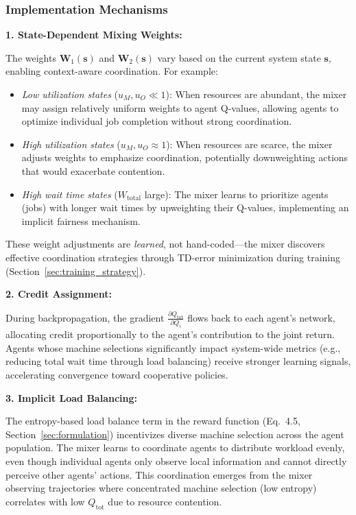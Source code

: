 \subsubsection{Implementation Mechanisms}

\textbf{1. State-Dependent Mixing Weights:}

The weights \(\mathbf{W}_1(\mathbf{s})\) and \(\mathbf{W}_2(\mathbf{s})\) vary based on the current system state \(\mathbf{s}\), enabling context-aware coordination. For example:
\begin{itemize}
    \item \textit{Low utilization states} (\(u_M, u_O \ll 1\)): When resources are abundant, the mixer may assign relatively uniform weights to agent Q-values, allowing agents to optimize individual job completion without strong coordination.
    \item \textit{High utilization states} (\(u_M, u_O \approx 1\)): When resources are scarce, the mixer adjusts weights to emphasize coordination, potentially downweighting actions that would exacerbate contention.
    \item \textit{High wait time states} (\(W_{\text{total}}\) large): The mixer learns to prioritize agents (jobs) with longer wait times by upweighting their Q-values, implementing an implicit fairness mechanism.
\end{itemize}

These weight adjustments are \textit{learned}, not hand-coded—the mixer discovers effective coordination strategies through TD-error minimization during training (Section~\ref{sec:training_strategy}).

\textbf{2. Credit Assignment:}

During backpropagation, the gradient \(\frac{\partial Q_{\text{tot}}}{\partial Q_i}\) flows back to each agent's network, allocating credit proportionally to the agent's contribution to the joint return. Agents whose machine selections significantly impact system-wide metrics (e.g., reducing total wait time through load balancing) receive stronger learning signals, accelerating convergence toward cooperative policies.

\textbf{3. Implicit Load Balancing:}

The entropy-based load balance term in the reward function (Eq.~4.5, Section~\ref{sec:formulation}) incentivizes diverse machine selection across the agent population. The mixer learns to coordinate agents to distribute workload evenly, even though individual agents only observe local information and cannot directly perceive other agents' actions. This coordination emerges from the mixer observing trajectories where concentrated machine selection (low entropy) correlates with low \(Q_{\text{tot}}\) due to resource contention.


